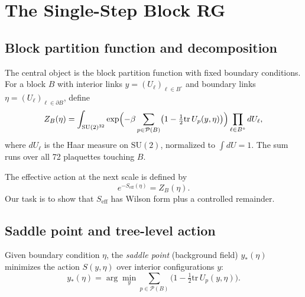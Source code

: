 \documentclass[11pt]{article}
\theoremstyle{definition}
\newcommand{\SU}{\mathrm{SU}}
\newcommand{\tr}{\mathrm{tr}}
\begin{document}
\section{The Single-Step Block RG}\label{sec:singlestep}

\subsection{Block partition function and decomposition}\label{subsec:blockZ}

The central object is the block partition function with fixed boundary
conditions.  For a block $B$ with interior links $y=(U_\ell)_{\ell\in B^\circ}$
and boundary links $\eta=(U_\ell)_{\ell\in\partial B}$, define
\begin{equation}\label{eq:blockZ}
Z_B(\eta)=\int_{\SU(2)^{32}}\exp\Bigl(-\beta
\sum_{p\in\mathcal{P}(B)}\bigl(1-\tfrac{1}{2}\tr\,U_p(y,\eta)\bigr)
\Bigr)\prod_{\ell\in B^\circ}dU_\ell,
\end{equation}
where $dU_\ell$ is the Haar measure on $\SU(2)$, normalized to
$\int dU=1$.  The sum runs over all 72 plaquettes touching $B$.

The effective action at the next scale is defined by
\begin{equation}\label{eq:Seff-def}
e^{-S_{\mathrm{eff}}(\eta)}=Z_B(\eta).
\end{equation}
Our task is to show that $S_{\mathrm{eff}}$ has Wilson form plus
a controlled remainder.

\subsection{Saddle point and tree-level action}\label{subsec:saddle}

Given boundary condition $\eta$, the \emph{saddle point} (background
field) $y_*(\eta)$ minimizes the action $S(y,\eta)$ over interior
configurations $y$:
\begin{equation}
y_*(\eta)=\arg\min_y\sum_{p\in\mathcal{P}(B)}
\bigl(1-\tfrac{1}{2}\tr\,U_p(y,\eta)\bigr).
\end{equation}
\end{document}
